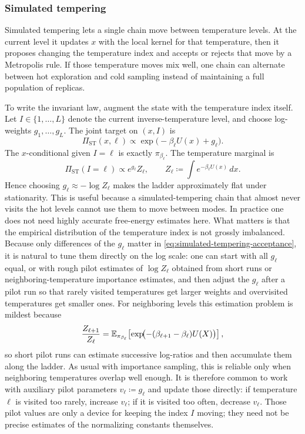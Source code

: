 \subsubsection{Simulated tempering}
\label{subsubsec:simulated-tempering}

Simulated tempering lets a single chain move between temperature levels.
At the current level it updates \(x\) with the local kernel for that temperature, then it proposes changing the temperature index and accepts or rejects that move by a Metropolis rule.
If those temperature moves mix well, one chain can alternate between hot exploration and cold sampling instead of maintaining a full population of replicas.

To write the invariant law, augment the state with the temperature index itself.
Let $I\in\{1,\dots,L\}$ denote the current inverse-temperature level, and choose log-weights $g_1,\dots,g_L$.
The joint target on $(x,I)$ is
\begin{equation}
  \Pi_{\mathrm{ST}}(x,\ell)
  \propto
  \exp\!\bigl(-\beta_\ell U(x) + g_\ell\bigr).
  \label{eq:simulated-tempering-joint}
\end{equation}
The $x$-conditional given $I=\ell$ is exactly $\pi_{\beta_\ell}$.
The temperature marginal is
\begin{equation}
  \Pi_{\mathrm{ST}}(I=\ell)
  \propto
  e^{g_\ell} Z_\ell,
  \qquad
  Z_\ell \coloneqq \int e^{-\beta_\ell U(x)}\,dx.
  \label{eq:simulated-tempering-marginal}
\end{equation}
Hence choosing $g_\ell \approx -\log Z_\ell$ makes the ladder approximately flat under stationarity.
This is useful because a simulated-tempering chain that almost never visits the hot levels cannot use them to move between modes.
In practice one does not need highly accurate free-energy estimates here.
What matters is that the empirical distribution of the temperature index is not grossly imbalanced.
Because only differences of the $g_\ell$ matter in \eqref{eq:simulated-tempering-acceptance}, it is natural to tune them directly on the log scale:
one can start with all $g_\ell$ equal, or with rough pilot estimates of $\log Z_\ell$ obtained from short runs or neighboring-temperature importance estimates, and then adjust the $g_\ell$ after a pilot run so that rarely visited temperatures get larger weights and overvisited temperatures get smaller ones.
For neighboring levels this estimation problem is mildest because
\[
  \frac{Z_{\ell+1}}{Z_\ell}
  =
  \mathbb{E}_{\pi_{\beta_\ell}}\!\left[
    \exp\!\bigl(-(\beta_{\ell+1}-\beta_\ell)U(X)\bigr)
  \right],
\]
so short pilot runs can estimate successive log-ratios and then accumulate them along the ladder.
As usual with importance sampling, this is reliable only when neighboring temperatures overlap well enough.
It is therefore common to work with auxiliary pilot parameters $v_\ell\coloneqq g_\ell$ and update those directly:
if temperature $\ell$ is visited too rarely, increase $v_\ell$; if it is visited too often, decrease $v_\ell$.
Those pilot values are only a device for keeping the index $I$ moving; they need not be precise estimates of the normalizing constants themselves.


